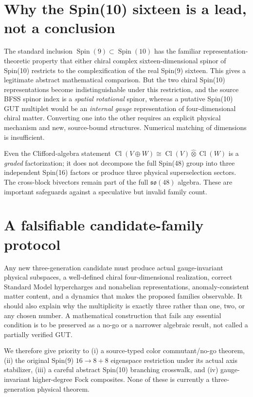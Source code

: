 \section{Why the Spin(10) sixteen is a lead, not a conclusion}
The standard inclusion $\operatorname{Spin}(9)\subset
\operatorname{Spin}(10)$ has the familiar representation-theoretic
property that either chiral complex sixteen-dimensional spinor of
Spin(10) restricts to the complexification of the real Spin(9)
sixteen. This gives a legitimate abstract mathematical comparison.
But the two chiral Spin(10) representations become indistinguishable
under this restriction, and the source BFSS spinor index is a
\emph{spatial rotational} spinor, whereas a putative Spin(10) GUT
multiplet would be an \emph{internal gauge} representation of
four-dimensional chiral matter. Converting one into the other
requires an explicit physical mechanism and new, source-bound
structures. Numerical matching of dimensions is insufficient.

Even the Clifford-algebra statement
$\operatorname{Cl}(V\oplus W)\cong
\operatorname{Cl}(V)\widehat\otimes\operatorname{Cl}(W)$
is a \emph{graded} factorization; it does not decompose the full
Spin(48) group into three independent Spin(16) factors or produce
three physical superselection sectors. The cross-block bivectors
remain part of the full $\mathfrak{so}(48)$ algebra. These are
important safeguards against a speculative but invalid family count.

\section{A falsifiable candidate-family protocol}
Any new three-generation candidate must produce actual gauge-invariant
physical subspaces, a well-defined chiral four-dimensional
realization, correct Standard Model hypercharges and nonabelian
representations, anomaly-consistent matter content, and a dynamics
that makes the proposed families observable. It should also explain
why the multiplicity is exactly three rather than one, two, or any
chosen number. A mathematical construction that fails any essential
condition is to be preserved as a no-go or a narrower algebraic
result, not called a partially verified GUT.

We therefore give priority to (i) a source-typed color commutant/no-go
theorem, (ii) the original Spin(9) $16\to8+8$ eigenspace
restriction under its actual axis stabilizer, (iii) a careful
abstract Spin(10) branching crosswalk, and (iv) gauge-invariant
higher-degree Fock composites. None of these is currently a
three-generation physical theorem.
